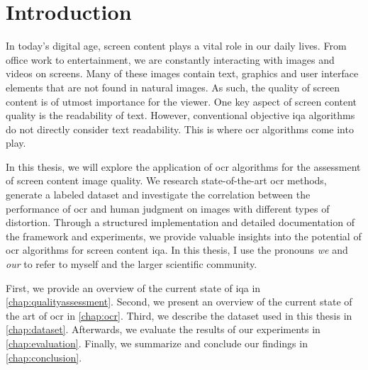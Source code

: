 \chapter{Introduction}
\label{chap:Introduction}


In today’s digital age, screen content plays a vital role in our daily lives.
From office work to entertainment, we are constantly interacting with images and videos on screens.
Many of these images contain text, graphics and user interface elements that are not found in natural images.
As such, the quality of screen content is of utmost importance for the viewer.
One key aspect of screen content quality is the readability of text.
However, conventional objective \gls{iqa} algorithms do not directly consider text readability.
This is where \gls{ocr} algorithms come into play.

In this thesis, we will explore the application of \gls{ocr} algorithms for the assessment of screen content image quality.
We research state-of-the-art \gls{ocr} methods, generate a labeled dataset and investigate the correlation between the performance of \gls{ocr} and human judgment on images with different types of distortion.
Through a structured implementation and detailed documentation of the framework and experiments, we provide valuable insights into the potential of \gls{ocr} algorithms for screen content \gls{iqa}.
In this thesis, I use the pronouns \textit{we} and \textit{our} to refer to myself and the larger scientific community.

First, we provide an overview of the current state of \gls{iqa} in \autoref{chap:qualityassessment}.
Second, we present an overview of the current state of the art of \gls{ocr} in \autoref{chap:ocr}.
Third, we describe the dataset used in this thesis in \autoref{chap:dataset}.
Afterwards, we evaluate the results of our experiments in \autoref{chap:evaluation}.
Finally, we summarize and conclude our findings in \autoref{chap:conclusion}.

